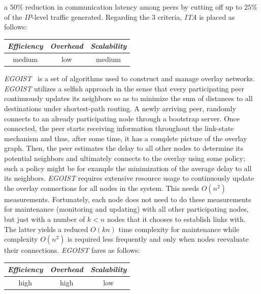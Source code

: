 a $50$\% reduction in communication latency among peers by cutting off up to 
$25$\% of the \emph{IP}-level traffic generated.
Regarding the $3$ criteria, \emph{ITA} is placed as follows:
%
\begin{center}
{\footnotesize
\begin{tabular}{ccc}
\emph{Efficiency} & \emph{Overhead} & \emph{Scalability} \\
\hline
medium &
low &
medium
\end{tabular}
}
\end{center}

\emph{EGOIST}~\cite{SLLBBR2008} is a set of algorithms used 
to construct and manage overlay networks. 
\emph{EGOIST} utilizes a selfish approach in the sense that every participating
peer continuously updates its neighbors so as to minimize the sum of distances
to all destinations under shortest-path routing. 
A newly arriving peer, randomly connects to an already participating 
node through a bootstrap server. Once connected, the peer starts receiving
information throughout the link-state mechanism and thus, after some time, 
it has a complete picture of the overlay graph. 
Then, the peer estimates the delay to all other nodes to
determine its potential neighbors and ultimately connects 
to the overlay using some policy; such a policy might be 
for example the minimization of the average delay to all its
neighbors. 
\emph{EGOIST} requires extensive resource usage to continuously
update the overlay connections for all nodes in the system. This needs
$O(n^2)$ measurements. 
Fortunately, each node does not need to do these
measurements for maintenance (monitoring and updating) with all other
participating nodes, but just with a number of $k<n$ nodes that it chooses to
establish links with. 
The latter yields a reduced $O(kn)$ time complexity for
maintenance while complexity $O(n^2)$ is required less frequently 
and only when nodes reevaluate their connections.
%
\emph{EGOIST} fares as follows:
\begin{center}
{\footnotesize
\begin{tabular}{ccc}
\emph{Efficiency} & \emph{Overhead} & \emph{Scalability} \\
\hline
high &
high &
low
\end{tabular}
}
\end{center}


